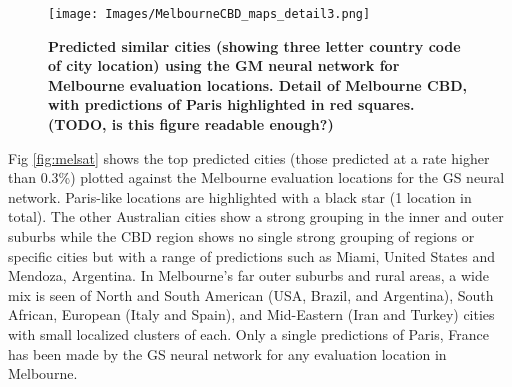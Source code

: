 \documentclass[10pt,letterpaper]{article}
\begin{document}
\begin{figure}[!htbp]
\centering     
\texttt{[image: Images/MelbourneCBD\_maps\_detail3.png]} 
\caption{\bf Predicted similar cities (showing three letter country code of city location) using the GM neural network for Melbourne evaluation locations. Detail of Melbourne CBD, with predictions of Paris highlighted in red squares. (TODO, is this figure readable enough?)}    
 \label{fig:melmapscbd}  
\end{figure} 

Fig \ref{fig:melsat} shows the top predicted cities (those predicted at a rate higher than 0.3\%) plotted against the Melbourne evaluation locations for the GS neural network. Paris-like locations are highlighted with a black star (1 location in total).  The other Australian cities show a strong grouping in the inner and outer suburbs while the CBD region shows no single strong grouping of regions or specific cities but with a range of predictions such as Miami, United States and Mendoza, Argentina. In Melbourne's far outer suburbs and rural areas, a wide mix is seen of North and South American (USA, Brazil, and Argentina), South African, European (Italy and Spain), and Mid-Eastern (Iran and Turkey) cities with small localized clusters of each. Only a single predictions of Paris, France has been made by the GS neural network for any evaluation location in Melbourne.
\end{document}
